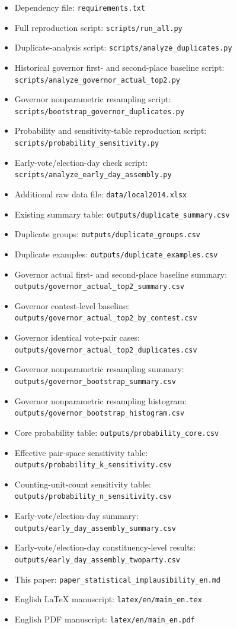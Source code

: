\documentclass[preprint]{IEIE}
\begin{document}
\begin{itemize}
\item Dependency file: \texttt{requirements.txt}
\item Full reproduction script: \texttt{scripts/run\_all.py}
\item Duplicate-analysis script: \texttt{scripts/analyze\_duplicates.py}
\item Historical governor first- and second-place baseline script: \texttt{scripts/analyze\_governor\_actual\_top2.py}
\item Governor nonparametric resampling script: \texttt{scripts/bootstrap\_governor\_duplicates.py}
\item Probability and sensitivity-table reproduction script: \texttt{scripts/probability\_sensitivity.py}
\item Early-vote/election-day check script: \texttt{scripts/analyze\_early\_day\_assembly.py}
\item Additional raw data file: \texttt{data/local2014.xlsx}
\item Existing summary table: \texttt{outputs/duplicate\_summary.csv}
\item Duplicate groups: \texttt{outputs/duplicate\_groups.csv}
\item Duplicate examples: \texttt{outputs/duplicate\_examples.csv}
\item Governor actual first- and second-place baseline summary: \texttt{outputs/governor\_actual\_top2\_summary.csv}
\item Governor contest-level baseline: \texttt{outputs/governor\_actual\_top2\_by\_contest.csv}
\item Governor identical vote-pair cases: \texttt{outputs/governor\_actual\_top2\_duplicates.csv}
\item Governor nonparametric resampling summary: \texttt{outputs/governor\_bootstrap\_summary.csv}
\item Governor nonparametric resampling histogram: \texttt{outputs/governor\_bootstrap\_histogram.csv}
\item Core probability table: \texttt{outputs/probability\_core.csv}
\item Effective pair-space sensitivity table: \texttt{outputs/probability\_k\_sensitivity.csv}
\item Counting-unit-count sensitivity table: \texttt{outputs/probability\_n\_sensitivity.csv}
\item Early-vote/election-day summary: \texttt{outputs/early\_day\_assembly\_summary.csv}
\item Early-vote/election-day constituency-level results: \texttt{outputs/early\_day\_assembly\_twoparty.csv}
\item This paper: \texttt{paper\_statistical\_implausibility\_en.md}
\item English LaTeX manuscript: \texttt{latex/en/main\_en.tex}
\item English PDF manuscript: \texttt{latex/en/main\_en.pdf}
\end{itemize}
\end{document}
